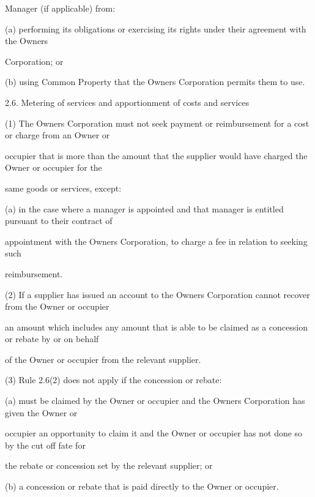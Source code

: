 \documentclass{article}
\begin{document}
{\fontsize{10.02}{1}Manager (if applicable) from: }

{\fontsize{9.962}{1}(a) performing its obligations or exercising its rights under their agreement with the Owners }

{\fontsize{10.02}{1}Corporation; or }

{\fontsize{9.962}{1}(b) using Common Property that the Owners Corporation permits them to use. }

{\fontsize{9.99}{1}2.6. Metering of services and apportionment of costs and services }

{\fontsize{9.962}{1}(1) The Owners Corporation must not seek payment or reimbursement for a cost or charge from an Owner or }

{\fontsize{10.02}{1}occupier that is more than the amount that the supplier would have charged the Owner or occupier for the }

{\fontsize{10.02}{1}same goods or services, except: }

{\fontsize{9.962}{1}(a) in the case where a manager is appointed and that manager is entitled pursuant to their contract of }

{\fontsize{10.02}{1}appointment with the Owners Corporation, to charge a fee in relation to seeking such }

{\fontsize{10.02}{1}reimbursement. }

{\fontsize{9.962}{1}(2) If a supplier has issued an account to the Owners Corporation cannot recover from the Owner or occupier }

{\fontsize{10.02}{1}an amount which includes any amount that is able to be claimed as a concession or rebate by or on behalf }

{\fontsize{10.02}{1}of the Owner or occupier from the relevant supplier. }

{\fontsize{9.962}{1}(3) Rule 2.6(2) does not apply if the concession or rebate: }

{\fontsize{9.962}{1}(a) must be claimed by the Owner or occupier and the Owners Corporation has given the Owner or }

{\fontsize{10.02}{1}occupier an opportunity to claim it and the Owner or occupier has not done so by the cut off fate for }

{\fontsize{10.02}{1}the rebate or concession set by the relevant supplier; or }

{\fontsize{9.962}{1}(b) a concession or rebate that is paid directly to the Owner or occupier. }

\newpage
\end{document}
